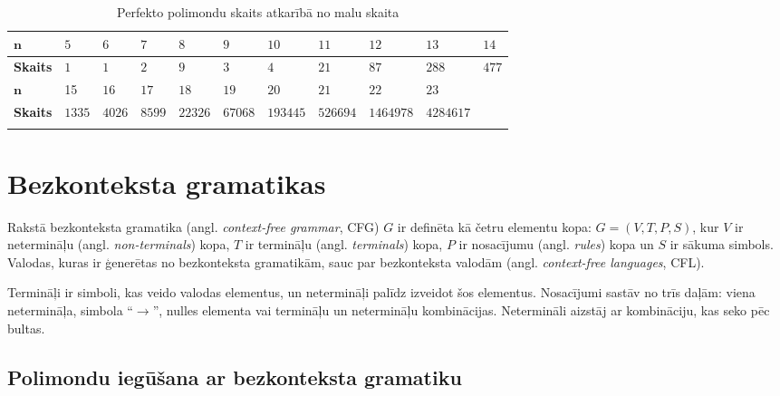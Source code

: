 \documentclass[utf8]{ludis2022}
\begin{document}
\begin{table}[H]
\centering
\caption{Perfekto polimondu skaits atkarībā no malu skaita}\label{tab:tab1}
\setlength{\tabcolsep}{5.1pt}
\begin{tabular}{!{\vrule width 1.5pt}l!{\vrule width 1.5pt}l|l|l|l|l|l|l|l|l|l!{\vrule width 1.5pt}}
\Xhline{1.5pt}
$\textbf{n}$            & $5$ & $6$    & $7$    & $8$     & $9$     & $10$     & $11$     & $12$ & $13$      & $14$  \\ \hline
\textbf{Skaits} & $1$        & $1$    & $2$    & $9$     & $3$     & $4$      & $21$     & $87$ & $288$     & $477$ \\ \Xhline{1.5pt}
$\textbf{n}$                     & 15         & $16$   & $17$   & $18$    & $19$    & $20$     & $21$     & $22$ & $23$      &     \\ \hline
\textbf{Skaits} & $1335$       & $4026$ & $8599$ & $22326$ & $67068$ & $193445$ & $526694$ & $1464978$   & $4284617$ &     \\ \Xhline{1.5pt}
\end{tabular}
\end{table}










\newpage

\section{Bezkonteksta gramatikas}

\firstparskip Rakstā \cite{cfg_def} bezkonteksta gramatika (angl. {\em context-free grammar}, CFG) $G$ ir definēta kā četru elementu kopa: $G=(V, T, P, S)$, kur $V$ ir netermināļu (angl. {\em non-terminals}) kopa, $T$ ir termināļu (angl. {\em terminals}) kopa, $P$ ir nosacījumu (angl. {\em rules}) kopa un $S$ ir sākuma simbols. Valodas, kuras ir ģenerētas no bezkonteksta gramatikām, sauc par bezkonteksta valodām (angl. {\em context-free languages}, CFL).


Termināļi ir simboli, kas veido valodas elementus, un netermināļi palīdz izveidot šos elementus. Nosacījumi sastāv no trīs daļām: viena netermināļa, simbola ``$\rightarrow$'', nulles elementa vai termināļu un netermināļu kombinācijas. Netermināli aizstāj ar kombināciju, kas seko pēc bultas.  

\subsection{Polimondu iegūšana ar bezkonteksta gramatiku}
\end{document}
